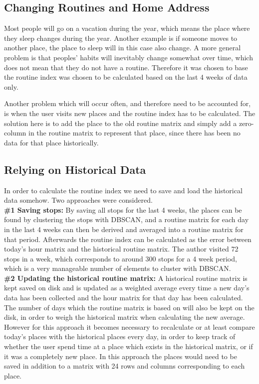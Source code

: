 \subsection{Changing Routines and Home Address}
Most people will go on a vacation during the year, which means the place where they sleep changes during the year. Another example is if someone moves to another place, the place to sleep will in this case also change. A more general problem is that peoples' habits will inevitably change somewhat over time, which does not mean that they do not have a routine. Therefore it was chosen to base the routine index was chosen to be calculated based on the last 4 weeks of data only. 

Another problem which will occur often, and therefore need to be accounted for, is when the user visits new places and the routine index has to be calculated. The solution here is to add the place to the old routine matrix and simply add a zero-column in the routine matrix to represent that place, since there has been no data for that place historically. 

\subsection{Relying on Historical Data}
In order to calculate the routine index we need to save and load the historical data somehow. Two approaches were considered.\\

\textbf{\#1 Saving stops:} By saving all stops for the last 4 weeks, the places can be found by clustering the stops with DBSCAN, and a routine matrix for each day in the last 4 weeks can then be derived and averaged into a routine matrix for that period. Afterwards the routine index can be calculated as the error between today's hour matrix and the historical routine matrix. The author visited 72 stops in a week, which corresponds to around 300 stops for a 4 week period, which is a very manageable number of elements to cluster with DBSCAN.\\

\textbf{\#2 Updating the historical routine matrix:} A historical routine matrix is kept saved on disk and is updated as a weighted average every time a new day's data has been collected and the hour matrix for that day has been calculated. The number of days which the routine matrix is based on will also be kept on the disk, in order to weigh the historical matrix when calculating the new average. However for this approach it becomes necessary to recalculate or at least compare today's places with the historical places every day, in order to keep track of whether the user spend time at a place which exists in the historical matrix, or if it was a completely new place. In this approach the places would need to be saved in addition to a matrix with 24 rows and columns corresponding to each place.

